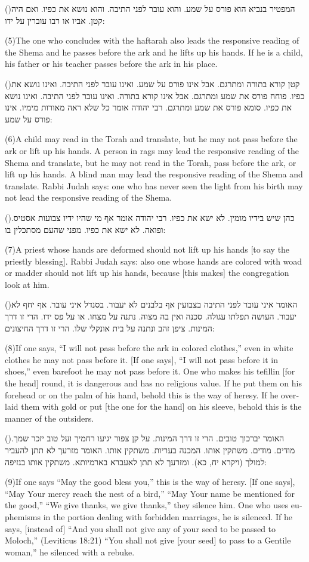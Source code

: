\documentclass[12pt, openany]{book}
\newcommand{\sethebfont}{
\fontsize{10.5pt}{13.1pt} \selectfont
}
\newcommand{\hebeng}[2]{
	{\sethebfont #1\\}
	
	\begin{english}
		#2
	\end{english}
}
\newcommand{\vsnum}[1]{(\hebrewnumeral{#1})\space}
\newcommand{\vsnumeng}[1]{(#1)\space}
\begin{document}
\hebeng{\vsnum{5}המפטיר בנביא הוא פורס על שמע. והוא עובר לפני התיבה. והוא נושא את כפיו. ואם היה קטן. אביו או רבו עוברין על ידו: }{\vsnumeng{5}The one who concludes with the haftarah also leads the responsive reading of the Shema and he passes before the ark and he lifts up his hands. If he is a child, his father or his teacher passes before the ark in his place.}%

\hebeng{\vsnum{6}קטן קורא בתורה ומתרגם. אבל אינו פורס על שמע. ואינו עובר לפני התיבה. ואינו נושא את כפיו. פוחח פורס את שמע ומתרגם. אבל אינו קורא בתורה. ואינו עובר לפני התיבה. ואינו נושא את כפיו. סומא פורס את שמע ומתרגם. רבי יהודה אומר כל שלא ראה מאורות מימיו. אינו פורס על שמע: }{\vsnumeng{6}A child may read in the Torah and translate, but he may not pass before the ark or lift up his hands. A person in rags may lead the responsive reading of the Shema and translate, but he may not read in the Torah, pass before the ark, or lift up his hands. A blind man may lead the responsive reading of the Shema and translate. Rabbi Judah says: one who has never seen the light from his birth may not lead the responsive reading of the Shema.}%

\hebeng{\vsnum{7}כהן שיש בידיו מומין. לא ישא את כפיו. רבי יהודה אומר אף מי שהיו ידיו צבועות אסטיס. ופואה. לא ישא את כפיו. מפני שהעם מסתכלין בו: }{\vsnumeng{7}A priest whose hands are deformed should not lift up his hands {[to say the priestly blessing]}. Rabbi Judah says: also one whose hands are colored with woad or madder should not lift up his hands, because {[this makes]} the congregation look at him.}%

\hebeng{\vsnum{8}האומר איני עובר לפני התיבה בצבועין אף בלבנים לא יעבור. בסנדל איני עובר. אף יחף לא יעבור. העושה תפלתו עגולה. סכנה ואין בה מצוה. נתנה על מצחו. או על פס ידו. הרי זו דרך המינות. ציפן זהב ונתנה על בית אונקלי שלו. הרי זו דרך החיצונים: }{\vsnumeng{8}If one says, “I will not pass before the ark in colored clothes,” even in white clothes he may not pass before it. {[If one says]}, “I will not pass before it in shoes,” even barefoot he may not pass before it. One who makes his tefillin {[for the head]} round, it is dangerous and has no religious value. If he put them on his forehead or on the palm of his hand, behold this is the way of heresy. If he overlaid them with gold or put {[the one for the hand]} on his sleeve, behold this is the manner of the outsiders.}%

\hebeng{\vsnum{9}האומר יברכוך טובים. הרי זו דרך המינות. על קן צפור יגיעו רחמיך ועל טוב יזכר שמך. מודים. מודים. משתקין אותו. המכנה בעריות. משתקין אותו. האומר מזרעך לא תתן להעביר למולך (ויקרא יח, כא). ומזרעך לא תתן לאעברא בארמיותא. משתקין אותו בנזיפה: }{\vsnumeng{9}If one says “May the good bless you,” this is the way of heresy. {[If one says]}, “May Your mercy reach the nest of a bird,” “May Your name be mentioned for the good,” “We give thanks, we give thanks,” they silence him. One who uses euphemisms in the portion dealing with forbidden marriages, he is silenced. If he says, {[instead of]} “And you shall not give any of your seed to be passed to Moloch,” (Leviticus 18:21) “You shall not give {[your seed]} to pass to a Gentile woman,” he silenced with a rebuke.}%
\end{document}
